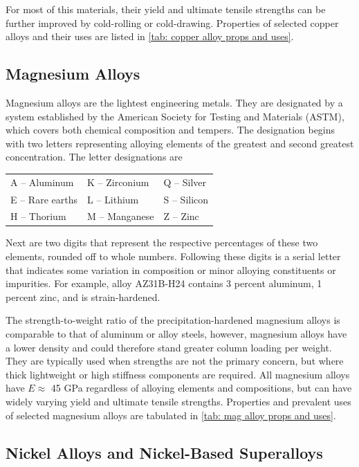 \documentclass[
10pt,
a4paper,
openany,
svgnames,
]{book}
\begin{document}
For most of this materials, their yield and ultimate tensile strengths can be further improved by cold-rolling or cold-drawing. Properties of selected copper alloys and their uses are listed in \cref{tab: copper alloy props and uses}. 

\subsection{Magnesium Alloys}

Magnesium alloys are the lightest engineering metals. They are designated by a system established by the American Society for Testing and Materials (ASTM), which covers both chemical composition and tempers. The designation begins with two letters representing alloying elements of the greatest and second greatest concentration. The letter designations are

\begin{table}[h]
  \centering
  \begin{tabular}{ lll }
    \hline
    A – Aluminum & K – Zirconium & Q – Silver \\
    E – Rare earths & L – Lithium & S – Silicon \\
    H – Thorium & M – Manganese & Z – Zinc \\
    \hline
  \end{tabular}
\end{table}

Next are two digits that represent the respective percentages of these two elements, rounded off to whole numbers. Following these digits is a serial letter that indicates some variation in composition or minor alloying constituents or impurities. For example, alloy AZ31B-H24 contains 3 percent aluminum, 1 percent zinc, and is strain-hardened.

The strength-to-weight ratio of the precipitation-hardened magnesium alloys is comparable to that of aluminum or alloy steels, however, magnesium alloys have a lower density and could therefore stand greater column loading per weight. They are typically used when strengths are not the primary concern, but where thick lightweight or high stiffness components are required. All magnesium alloys have $E \approx$ 45 GPa regardless of alloying elements and compositions, but can have widely varying yield and ultimate tensile strengths. Properties and prevalent uses of selected magnesium alloys are tabulated in \cref{tab: mag alloy props and uses}. 

\subsection{Nickel Alloys and Nickel-Based Superalloys}
\end{document}
